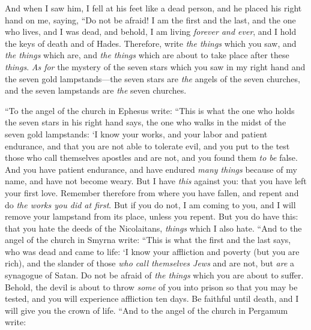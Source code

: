 \begin{biblechapter}
\verse And when I saw him, I fell at his feet like a dead person, and he placed his right hand on me, saying, “Do not be afraid! I am the first and the last,
\verse and the one who lives, and I was dead, and behold, I am living \textit{forever and ever}, and I hold the keys of death and of Hades.
\verse Therefore, write \textit{the things} which you saw, and \textit{the things} which are, and \textit{the things} which are about to take place after these \textit{things}.
\verse \textit{As for} the mystery of the seven stars which you saw in my right hand and the seven gold lampstands—the seven stars are \textit{the} angels of the seven churches, and the seven lampstands are \textit{the} seven churches.
\end{biblechapter}

\begin{biblechapter} %
 “To the angel of the church in Ephesus write:
\verse “This is what the one who holds the seven stars in his right hand says, the one who walks in the midst of the seven gold lampstands:
\verse ‘I know your works, and your labor and patient endurance, and that you are not able to tolerate evil, and you put to the test those who call themselves apostles and are not, and you found them \textit{to be} false.
\verse And you have patient endurance, and have endured \textit{many things} because of my name, and have not become weary.
\verse But I have \textit{this} against you: that you have left your first love.
\verse Remember therefore from where you have fallen, and repent and do \textit{the works you did at first}. But if you do not, I am coming to you, and I will remove your lampstand from its place, unless you repent.
\verse But you do have this: that you hate the deeds of the Nicolaitans, \textit{things} which I also hate.
 “And to the angel of the church in Smyrna write:
\verse “This is what the first and the last says, who was dead and came to life:
\verse ‘I know your affliction and poverty (but you are rich), and the slander of those \textit{who call themselves Jews} and are not, but \textit{are} a synagogue of Satan.
\verse Do not be afraid of \textit{the things} which you are about to suffer. Behold, the devil is about to throw \textit{some} of you into prison so that you may be tested, and you will experience affliction ten days. Be faithful until death, and I will give you the crown of life.
 “And to the angel of the church in Pergamum write:

\end{biblechapter}
